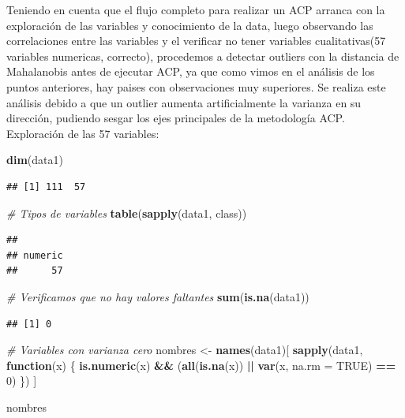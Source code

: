 \documentclass[
]{article}
\newenvironment{Shaded}{\begin{snugshade}}{\end{snugshade}}
\newcommand{\AttributeTok}[1]{\textcolor[rgb]{0.13,0.29,0.53}{#1}}
\newcommand{\CommentTok}[1]{\textcolor[rgb]{0.56,0.35,0.01}{\textit{#1}}}
\newcommand{\ConstantTok}[1]{\textcolor[rgb]{0.56,0.35,0.01}{#1}}
\newcommand{\ControlFlowTok}[1]{\textcolor[rgb]{0.13,0.29,0.53}{\textbf{#1}}}
\newcommand{\DecValTok}[1]{\textcolor[rgb]{0.00,0.00,0.81}{#1}}
\newcommand{\FunctionTok}[1]{\textcolor[rgb]{0.13,0.29,0.53}{\textbf{#1}}}
\newcommand{\NormalTok}[1]{#1}
\newcommand{\OtherTok}[1]{\textcolor[rgb]{0.56,0.35,0.01}{#1}}
\newcommand{\SpecialCharTok}[1]{\textcolor[rgb]{0.81,0.36,0.00}{\textbf{#1}}}
\begin{document}
Teniendo en cuenta que el flujo completo para realizar un ACP arranca
con la exploración de las variables y conocimiento de la data, luego
observando las correlaciones entre las variables y el verificar no tener
variables cualitativas(57 variables numericas, correcto), procedemos a
detectar outliers con la distancia de Mahalanobis antes de ejecutar ACP,
ya que como vimos en el análisis de los puntos anteriores, hay paises
con observaciones muy superiores. Se realiza este análisis debido a que
un outlier aumenta artificialmente la varianza en su dirección, pudiendo
sesgar los ejes principales de la metodología ACP.\\
Exploración de las 57 variables:

\begin{Shaded}
\begin{Highlighting}[]
\FunctionTok{dim}\NormalTok{(data1)}
\end{Highlighting}
\end{Shaded}

\begin{verbatim}
## [1] 111  57
\end{verbatim}

\begin{Shaded}
\begin{Highlighting}[]
\CommentTok{\# Tipos de variables}
\FunctionTok{table}\NormalTok{(}\FunctionTok{sapply}\NormalTok{(data1, class))}
\end{Highlighting}
\end{Shaded}

\begin{verbatim}
## 
## numeric 
##      57
\end{verbatim}

\begin{Shaded}
\begin{Highlighting}[]
\CommentTok{\# Verificamos que no hay valores faltantes}
\FunctionTok{sum}\NormalTok{(}\FunctionTok{is.na}\NormalTok{(data1))}
\end{Highlighting}
\end{Shaded}

\begin{verbatim}
## [1] 0
\end{verbatim}

\begin{Shaded}
\begin{Highlighting}[]
\CommentTok{\# Variables con varianza cero}
\NormalTok{nombres }\OtherTok{\textless{}{-}} \FunctionTok{names}\NormalTok{(data1)[}
  \FunctionTok{sapply}\NormalTok{(data1, }\ControlFlowTok{function}\NormalTok{(x) \{}
    \FunctionTok{is.numeric}\NormalTok{(x) }\SpecialCharTok{\&\&}
\NormalTok{      (}\FunctionTok{all}\NormalTok{(}\FunctionTok{is.na}\NormalTok{(x)) }\SpecialCharTok{||} \FunctionTok{var}\NormalTok{(x, }\AttributeTok{na.rm =} \ConstantTok{TRUE}\NormalTok{) }\SpecialCharTok{==} \DecValTok{0}\NormalTok{)}
\NormalTok{  \})}
\NormalTok{]}

\NormalTok{nombres}
\end{Highlighting}
\end{Shaded}
\end{document}

